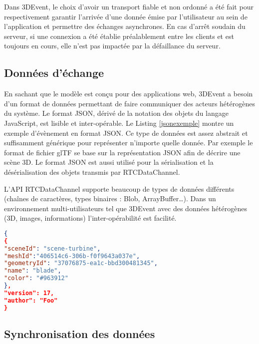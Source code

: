 Dans 3DEvent, le choix d'avoir un transport 
fiable et non ordonné a été fait pour respectivement 
garantir l'arrivée d'une donnée émise par l'utilisateur au sein de l'application et 
permettre des échanges asynchrones.
En cas d'arrêt soudain du serveur, si une connexion a été établie préalablement 
entre les clients et est toujours en cours, elle n'est pas impactée par la défaillance 
du serveur.
\subsection{Données d'échange}
En sachant que le modèle est conçu pour des applications web, 3DEvent a besoin 
d'un format de données permettant de faire communiquer des acteurs hétérogènes 
du système. Le format \gls{JSON}, dérivé de la notation des objets du langage 
JavaScript, est lisible et inter-opérable. Le Listing \ref{jsonexemple} montre un exemple d'évènement en format JSON.
Ce type de données est assez abstrait et suffisamment générique pour 
représenter n'importe quelle donnée. Par exemple le format de fichier 
\gls{glTF} se base sur la représentation \gls{JSON} afin de 
décrire une scène 3D.
Le format \gls{JSON} est aussi utilisé pour la sérialisation et la désérialisation des 
objets transmis par RTCDataChannel. 

L'\acrshort{API} RTCDataChannel supporte beaucoup de types de données 
différents (chaînes de caractères, types binaires : Blob, ArrayBuffer\dots). Dans 
un environnement multi-utilisateurs tel que 3DEvent avec des données hétérogènes (3D, images, 
informations) l'inter-opérabilité est facilité.

\begin{lstlisting}[language=json,firstnumber=1,label=jsonexemple,caption=Mesh 
added to Scene event and parameters]
{
{
"sceneId": "scene-turbine",
"meshId":"406514c6-306b-f0f9643a037e",
"geometryId": "37076875-ea1c-bbd300481345",
"name": "blade",
"color": "#963912"
},
"version": 17,
"author": "Foo"
}
\end{lstlisting}

\subsection{Synchronisation des données}
